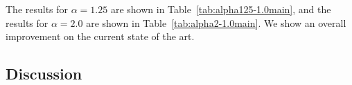 \documentclass{article}
\theoremstyle{plain}
\theoremstyle{definition}
\theoremstyle{remark}
\begin{document}
The results for $\alpha = 1.25$ are shown in Table~\ref{tab:alpha125-1.0main}, and the results for  $\alpha = 2.0$ are shown in Table~\ref{tab:alpha2-1.0main}. We show an overall improvement on the current state of the art.


\subsection{Discussion}





\end{document}
